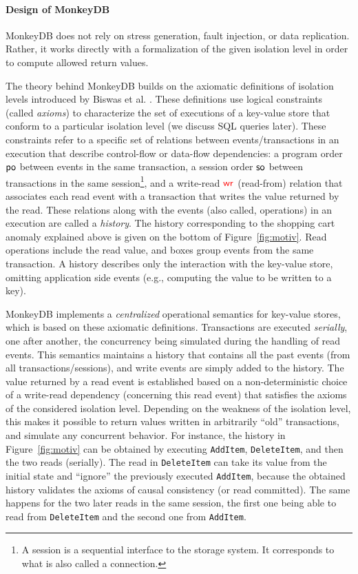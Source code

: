 \paragraph{Design of MonkeyDB}
MonkeyDB does not rely on stress generation, fault
injection, or data replication. 
Rather, it works directly with a formalization of
the given isolation level in order to compute allowed return values. 

The theory behind MonkeyDB builds on the axiomatic definitions of isolation
levels introduced by Biswas et al. \cite{DBLP:journals/pacmpl/BiswasE19}. These
definitions use logical constraints (called \emph{axioms}) to characterize the
set of executions of a key-value store that conform to a particular isolation
level (we discuss SQL queries later). These constraints refer to a specific set of
relations between events/transactions in an execution that describe control-flow
or data-flow dependencies: a program order $\mathsf{po}$ between events in the same
transaction, a session order $\mathsf{so}$ between transactions in the same session\footnote{A
session is a sequential interface to the storage system. It corresponds to what
is also called a connection.}, and a write-read $\textcolor{red}{\mathsf{wr}_{}}$ (read-from) relation that
associates each read event with a transaction that writes the value returned by
the read. These relations along with the events (also called, operations) in an
execution are called a \emph{history}. The history corresponding to the 
shopping cart anomaly explained above is given on the bottom of Figure~\ref{fig:motiv}.
Read operations include the read value, and boxes group events from the same transaction.
A history describes only the
interaction with the key-value store, omitting application side events (e.g., computing
the value to be written to a key). 

MonkeyDB implements a \emph{centralized} operational semantics for key-value stores, which is based on these axiomatic definitions. Transactions are executed \emph{serially}, one after another, the concurrency being simulated during the handling of read events.  
This semantics maintains a history that contains all the past events (from all
transactions/sessions), and write events are simply added to the history. The
value returned by a read event is established based on a non-deterministic
choice of a write-read dependency (concerning this read event) that satisfies
the axioms of the considered isolation level.
Depending on the weakness of the isolation
level, this makes it possible to return values written in arbitrarily ``old''
transactions, and simulate any concurrent behavior. For instance, the history in Figure~\ref{fig:motiv}
can be obtained by executing \texttt{AddItem}, \texttt{DeleteItem}, and then the two reads (serially).
The read in \texttt{DeleteItem} can take its value from the initial state and ``ignore'' the
previously executed \texttt{AddItem}, because the obtained history validates the axioms of 
causal consistency (or read committed). The same happens for the two later reads in the same
session, the first one being able to read from \texttt{DeleteItem} and the second one
from \texttt{AddItem}.

